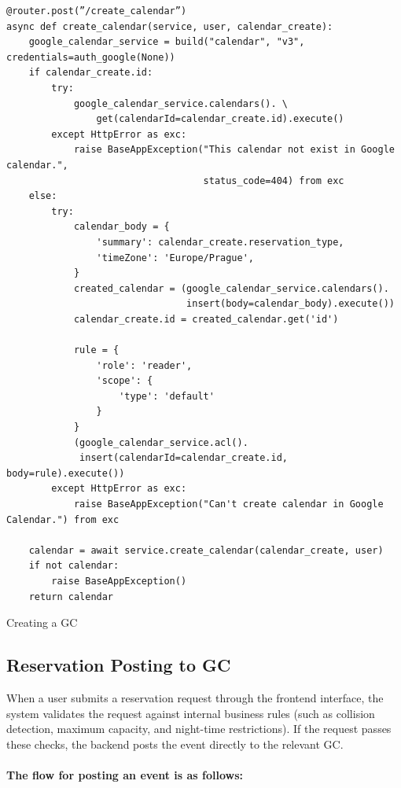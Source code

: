 \begin{listing}[H]
  \begin{verbatim}
@router.post(”/create_calendar”)
async def create_calendar(service, user, calendar_create):
    google_calendar_service = build("calendar", "v3", credentials=auth_google(None))
    if calendar_create.id:
        try:
            google_calendar_service.calendars(). \
                get(calendarId=calendar_create.id).execute()
        except HttpError as exc:
            raise BaseAppException("This calendar not exist in Google calendar.",
                                   status_code=404) from exc
    else:
        try:
            calendar_body = {
                'summary': calendar_create.reservation_type, 
                'timeZone': 'Europe/Prague', 
            }
            created_calendar = (google_calendar_service.calendars().
                                insert(body=calendar_body).execute())
            calendar_create.id = created_calendar.get('id')

            rule = {
                'role': 'reader',  
                'scope': {
                    'type': 'default' 
                }
            }
            (google_calendar_service.acl().
             insert(calendarId=calendar_create.id, body=rule).execute())
        except HttpError as exc:
            raise BaseAppException("Can't create calendar in Google Calendar.") from exc

    calendar = await service.create_calendar(calendar_create, user)
    if not calendar:
        raise BaseAppException()
    return calendar
\end{verbatim}
\caption{Creating a GC}
\label{list:create-gc}
\end{listing}

\subsection{Reservation Posting to GC}

When a user submits a reservation request through the frontend interface, the system validates the request against internal business rules (such as collision detection, maximum capacity, and night-time restrictions). If the request passes these checks, the backend posts the event directly to the relevant GC.

\newpage
\paragraph{The flow for posting an event is as follows:}

